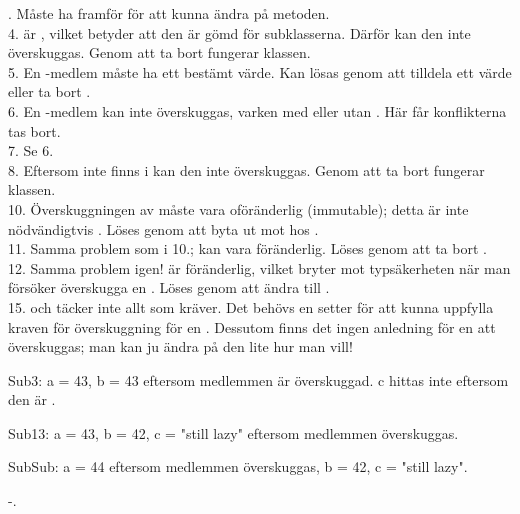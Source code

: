 . Måste ha  framför  för att kunna ändra på metoden. \\
4.  är , vilket betyder att den är gömd för subklasserna. Därför kan den inte överskuggas. Genom att ta bort  fungerar klassen. \\
5. En -medlem måste ha ett bestämt värde. Kan lösas genom att tilldela  ett värde eller ta bort . \\
6. En -medlem kan inte överskuggas, varken med eller utan . Här får konflikterna tas bort.  \\
7. Se 6. \\
8. Eftersom  inte finns i  kan den inte överskuggas. Genom att ta bort  fungerar klassen. \\
10. Överskuggningen av  måste vara oföränderlig (immutable); detta är inte nödvändigtvis . Löses genom att byta ut  mot  hos .  \\
11. Samma problem som i 10.;  kan vara föränderlig. Löses genom att ta bort . \\
12. Samma problem igen!  är föränderlig, vilket bryter mot typsäkerheten när man försöker överskugga en . Löses genom att ändra  till . \\
15. och  täcker inte allt som  kräver. Det behövs en setter för att kunna uppfylla kraven för överskuggning för en . Dessutom finns det ingen anledning för en  att överskuggas; man kan ju ändra på den lite hur man vill!

\SubtaskSolved  Sub3: a = 43, b = 43 eftersom medlemmen är överskuggad. c hittas inte eftersom den är .

Sub13: a = 43, b = 42, c = "still lazy" eftersom medlemmen överskuggas.

SubSub: a = 44 eftersom medlemmen överskuggas, b = 42, c = "still lazy".

\SubtaskSolved  -.


\QUESTEND





\clearpage





\AdvancedTasks %

